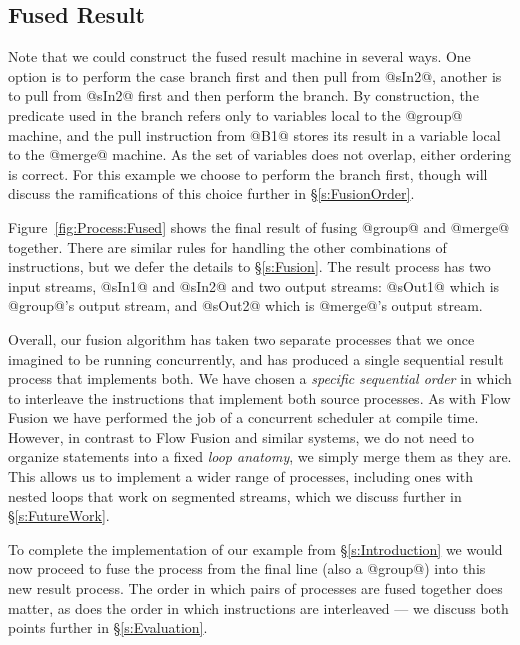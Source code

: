 \subsection{Fused Result}

Note that we could construct the fused result machine in several ways. One option is to perform the case branch first and then pull from @sIn2@, another is to pull from @sIn2@ first and then perform the branch. By construction, the predicate used in the branch refers only to variables local to the @group@ machine, and the pull instruction from @B1@ stores its result in a variable local to the @merge@ machine. As the set of variables does not overlap, either ordering is correct. For this example we choose to perform the branch first, though will discuss the ramifications of this choice further in \S\ref{s:FusionOrder}. 


Figure~\ref{fig:Process:Fused} shows the final result of fusing @group@ and @merge@ together. There are similar rules for handling the other combinations of instructions, but we defer the details to \S\ref{s:Fusion}. The result process has two input streams, @sIn1@ and @sIn2@ and two output streams: @sOut1@ which is @group@'s output stream, and @sOut2@ which is @merge@'s output stream. 

Overall, our fusion algorithm has taken two separate processes that we once imagined to be running concurrently, and has produced a single sequential result process that implements both. We have chosen a \emph{specific sequential order} in which to interleave the instructions that implement both source processes. As with Flow Fusion \cite{lippmeier2013data} we have performed the job of a concurrent scheduler at compile time. However, in contrast to Flow Fusion and similar systems, we do not need to organize statements into a fixed \emph{loop anatomy}, we simply merge them as they are. This allows us to implement a wider range of processes, including ones with nested loops that work on segmented streams, which we discuss further in \S\ref{s:FutureWork}. 

To complete the implementation of our example from \S\ref{s:Introduction} we would now proceed to fuse the process from the final line (also a @group@) into this new result process. The order in which pairs of processes are fused together does matter, as does the order in which instructions are interleaved --- we discuss both points further in \S\ref{s:Evaluation}.

